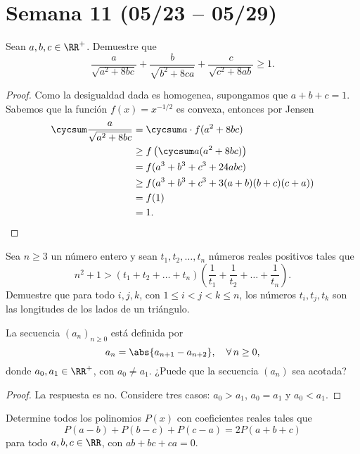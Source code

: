 \section{Semana 11 (05/23 -- 05/29)}


\begin{probEG}
	Sean $a,b,c\in\RR^+$. Demuestre que
	\[\frac{a}{\sqrt{a^2+8bc}}+\frac{b}{\sqrt{b^2+8ca}}+\frac{c}{\sqrt{c^2+8ab}}\ge 1.\]
\end{probEG}

\begin{proof}
	Como la desigualdad dada es homogenea, supongamos que $a+b+c=1$. Sabemos que la función $f(x)=x^{-1/2}$ es convexa, entonces por Jensen
	\begin{align*}
		\cycsum\frac{a}{\sqrt{a^2+8bc}}
		&=\cycsum a\cdot f(a^2+8bc)\\
		&\ge f\left(\cycsum a(a^2+8bc)\right)\\
		&=f(a^3+b^3+c^3+24abc)\\
		&\ge f(a^3+b^3+c^3+3(a+b)(b+c)(c+a))\\
		&=f(1)\\
		&=1.
	\end{align*}
\end{proof}

\begin{probEG}
	Sea $n\ge 3$ un número entero y sean $t_1,t_2,\dots,t_n$ números reales positivos tales que
	\[n^2+1>(t_1+t_2+\dots+t_n)\left(\frac{1}{t_1}+\frac{1}{t_2}+\dots+\frac{1}{t_n}\right).\]
	Demuestre que para todo $i,j,k$, con $1\le i<j<k\le n$, los números $t_i,t_j,t_k$ son las longitudes de los lados de un triángulo.
\end{probEG}

\begin{probEG}
	La secuencia $(a_n)_{n\ge 0}$ está definida por
	\[a_n=\abs{a_{n+1}-a_{n+2}},\quad\forall\,n\ge 0,\]
	donde $a_0,a_1\in\RR^+$, con $a_0\ne a_1$. ¿Puede que la secuencia $(a_n)$ sea acotada?
\end{probEG}

\begin{proof}
	La respuesta es no. Considere tres casos: $a_0>a_1$, $a_0=a_1$ y $a_0<a_1$.
\end{proof}

\begin{probMR}
	Determine todos los polinomios $P(x)$ con coeficientes reales tales que
	\[P(a-b)+P(b-c)+P(c-a)=2P(a+b+c)\]
	para todo $a,b,c\in\RR$, con $ab+bc+ca=0$.
\end{probMR}

